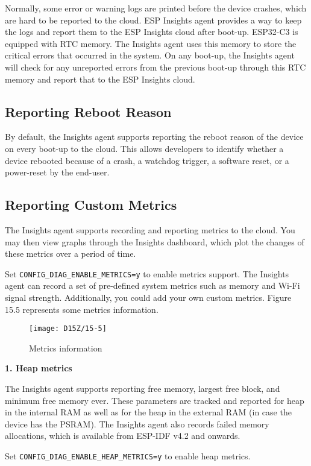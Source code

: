 \documentclass[a4paper,12pt]{book}
\begin{document}
Normally, some error or warning logs are printed before the device crashes, which are hard to be reported to the cloud. ESP Insights agent provides a way to keep the logs and report them to the ESP Insights cloud after boot-up. ESP32-C3 is equipped with RTC memory. The Insights agent uses this memory to store the critical errors that occurred in the system. On any boot-up, the Insights agent will check for any unreported errors from the previous boot-up through this RTC memory and report that to the ESP Insights cloud.

\subsection{Reporting Reboot Reason}
By default, the Insights agent supports reporting the reboot reason of the device on every boot-up to the cloud. This allows developers to identify whether a device rebooted because of a crash, a watchdog trigger, a software reset, or a power-reset by the end-user.

\subsection{Reporting Custom Metrics}
The Insights agent supports recording and reporting metrics to the cloud. You may then view graphs through the Insights dashboard, which plot the changes of these metrics over a period of time.

Set \verb|CONFIG_DIAG_ENABLE_METRICS=y| to enable metrics support. The Insights agent can record a set of pre-defined system metrics such as memory and Wi-Fi signal strength. Additionally, you could add your own custom metrics. Figure 15.5 represents some metrics information.

\begin{figure}[!h]
    \centering
    \texttt{[image: D15Z/15-5]}
    \caption{Metrics information}
\end{figure}

\textbf{1. Heap metrics}

The Insights agent supports reporting free memory, largest free block, and minimum free memory ever. These parameters are tracked and reported for heap in the internal RAM as well as for the heap in the external RAM (in case the device has the PSRAM). The Insights agent also records failed memory allocations, which is available from ESP-IDF v4.2 and onwards.

Set \verb|CONFIG_DIAG_ENABLE_HEAP_METRICS=y| to enable heap metrics.
\end{document}
